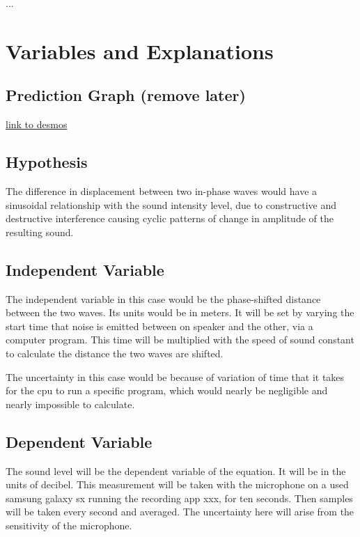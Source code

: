 \documentclass[12pt]{article}
\begin{document}
...

\section{Variables and Explanations}

\subsection{Prediction Graph (remove later)}

\href{https://www.desmos.com/calculator/ahmohu46il}{link to desmos}

\subsection{Hypothesis}

The difference in displacement between two in-phase waves would have a sinusoidal relationship with the sound intensity level, due to constructive and destructive interference causing cyclic patterns of change in amplitude of the resulting sound.

\subsection{Independent Variable}

The independent variable in this case would be the phase-shifted distance between the two waves. Its units would be in meters. It will be set by varying the start time that noise is emitted between on speaker and the other, via a computer program. This time will be multiplied with the speed of sound constant to calculate the distance the two waves are shifted.

The uncertainty in this case would be because of variation of time that it takes for the cpu to run a specific program, which would nearly be negligible and nearly impossible to calculate.

\subsection{Dependent Variable}

The sound level will be the dependent variable of the equation. It will be in the units of decibel. This measurement will be taken with the microphone on a used samsung galaxy sx running the recording app xxx, for ten seconds. Then samples will be taken every second and averaged. The uncertainty here will arise from the sensitivity of the microphone.
\end{document}

